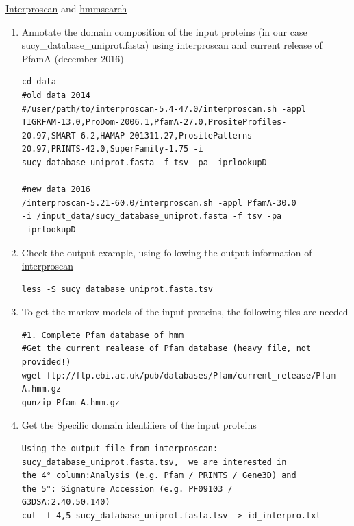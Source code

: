 \documentclass[a4paper,11pt]{report}
\begin{document}
\href{https://www.ebi.ac.uk/interpro/interproscan.htm}{Interproscan} and \href{http://hmmer.org/}{hmmsearch}

\begin{enumerate}
\item Annotate the domain composition of the input proteins (in our case sucy\_database\_uniprot.fasta) using interproscan and current release of PfamA  (december 2016) 


\begin{verbatim}
cd data
#old data 2014
#/user/path/to/interproscan-5.4-47.0/interproscan.sh -appl 
TIGRFAM-13.0,ProDom-2006.1,PfamA-27.0,PrositeProfiles-
20.97,SMART-6.2,HAMAP-201311.27,PrositePatterns-
20.97,PRINTS-42.0,SuperFamily-1.75 -i 
sucy_database_uniprot.fasta -f tsv -pa -iprlookupD

#new data 2016
/interproscan-5.21-60.0/interproscan.sh -appl PfamA-30.0 
-i /input_data/sucy_database_uniprot.fasta -f tsv -pa 
-iprlookupD

\end{verbatim}

\item  Check the output example, using  following the output information of  \href{https://github.com/ebi-pf-team/interproscan/wiki/InterProScan5OutputFormats}{interproscan}

\begin{verbatim}
less -S sucy_database_uniprot.fasta.tsv
\end{verbatim}

\item To get the markov models of the input  proteins, the following files are needed

\begin{verbatim}
#1. Complete Pfam database of hmm 
#Get the current realease of Pfam database (heavy file, not provided!)
wget ftp://ftp.ebi.ac.uk/pub/databases/Pfam/current_release/Pfam-A.hmm.gz
gunzip Pfam-A.hmm.gz

\end{verbatim}

\item Get the Specific domain identifiers of the input proteins 

\begin{verbatim}
Using the output file from interproscan: 
sucy_database_uniprot.fasta.tsv,  we are interested in 
the 4° column:Analysis (e.g. Pfam / PRINTS / Gene3D) and 
the 5°: Signature Accession (e.g. PF09103 / 
G3DSA:2.40.50.140) 
cut -f 4,5 sucy_database_uniprot.fasta.tsv  > id_interpro.txt 


\end{verbatim}
\end{enumerate}
\end{document}
